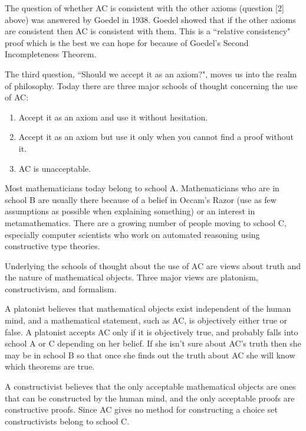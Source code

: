 The question of whether AC is consistent with the other axioms (question [2]
above) was answered by Goedel in 1938.  Goedel showed that if the other axioms
are consistent then AC is consistent with them.  This is a ``relative
consistency" proof which is the best we can hope for because of Goedel's
Second Incompleteness Theorem.

The third question, ``Should we accept it as an axiom?", moves us into the
realm of philosophy.  Today there are three major schools of thought
concerning the use of AC:
\begin{enumerate}
\item Accept it as an axiom and use it without hesitation.
\item Accept it as an axiom but use it only when you cannot find a proof
    without it.
\item AC is unacceptable.
\end{enumerate}
Most mathematicians today belong to school A.  Mathematicians who are in
school B are usually there because of a belief in Occam's Razor (use as few
assumptions as possible when explaining something) or an interest in
metamathematics.  There are a growing number of people moving to school C,
especially computer scientists who work on automated reasoning using
constructive type theories.

Underlying the schools of thought about the use of AC are views about truth
and the nature of mathematical objects.  Three major views are platonism,
constructivism, and formalism.

\medskip
{}
\smallskip

A platonist believes that mathematical objects exist independent of the human
mind, and a mathematical statement, such as AC, is objectively either true or
false.  A platonist accepts AC only if it is objectively true, and probably
falls into school A or C depending on her belief.  If she isn't sure about
AC's truth then she may be in school B so that once she finds out the truth
about AC she will know which theorems are true.

\medskip
{}
\smallskip

A constructivist believes that the only acceptable mathematical objects are
ones that can be constructed by the human mind, and the only acceptable proofs
are constructive proofs.  Since AC gives no method for constructing a choice
set constructivists belong to school C.

\medskip
{}
\smallskip

